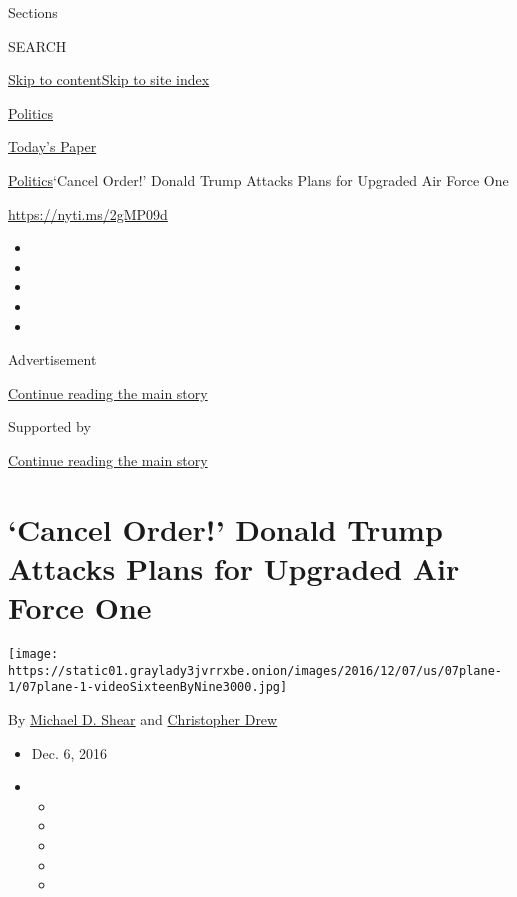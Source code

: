 Sections

SEARCH

\protect\hyperlink{site-content}{Skip to
content}\protect\hyperlink{site-index}{Skip to site index}

\href{https://www.nytimes3xbfgragh.onion/section/politics}{Politics}

\href{https://myaccount.nytimes3xbfgragh.onion/auth/login?response_type=cookie\&client_id=vi}{}

\href{https://www.nytimes3xbfgragh.onion/section/todayspaper}{Today's
Paper}

\href{/section/politics}{Politics}\textbar{}`Cancel Order!' Donald Trump
Attacks Plans for Upgraded Air Force One

\href{https://nyti.ms/2gMP09d}{https://nyti.ms/2gMP09d}

\begin{itemize}
\item
\item
\item
\item
\item
\end{itemize}

Advertisement

\protect\hyperlink{after-top}{Continue reading the main story}

Supported by

\protect\hyperlink{after-sponsor}{Continue reading the main story}

\hypertarget{cancel-order-donald-trump-attacks-plans-for-upgraded-air-force-one}{%
\section{`Cancel Order!' Donald Trump Attacks Plans for Upgraded Air
Force
One}\label{cancel-order-donald-trump-attacks-plans-for-upgraded-air-force-one}}

\texttt{[image: https://static01.graylady3jvrrxbe.onion/images/2016/12/07/us/07plane-1/07plane-1-videoSixteenByNine3000.jpg]}

By \href{http://www.nytimes3xbfgragh.onion/by/michael-d-shear}{Michael
D. Shear} and
\href{http://www.nytimes3xbfgragh.onion/by/christopher-drew}{Christopher
Drew}

\begin{itemize}
\item
  Dec. 6, 2016
\item
  \begin{itemize}
  \item
  \item
  \item
  \item
  \item
  \end{itemize}
\end{itemize}

